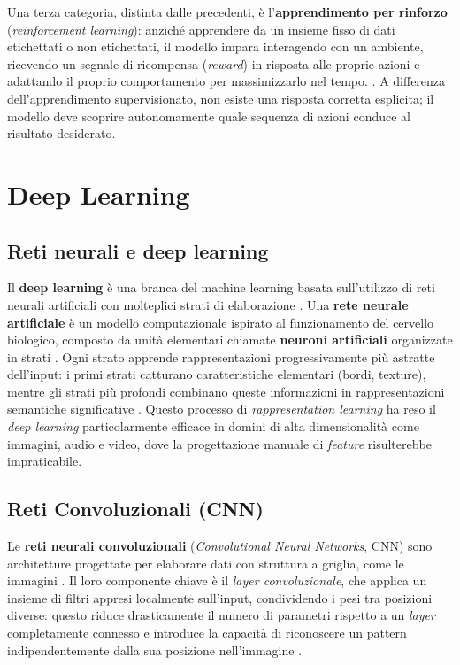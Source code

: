 Una terza categoria, distinta dalle precedenti, è l'\textbf{apprendimento per rinforzo} (\textit{reinforcement learning}): anziché apprendere da un insieme fisso di dati etichettati o non etichettati, il modello impara interagendo con un ambiente, ricevendo un segnale di ricompensa (\textit{reward}) in risposta alle proprie azioni e adattando il proprio comportamento per massimizzarlo nel tempo. \cite{bishop2006pattern, sutton2018}. A differenza dell'apprendimento supervisionato, non esiste una risposta corretta esplicita; il modello deve scoprire autonomamente quale sequenza di azioni conduce al risultato desiderato.

\section{Deep Learning}
\subsection{Reti neurali e deep learning}
Il \textbf{deep learning} è una branca del machine learning basata sull'utilizzo di reti neurali artificiali con molteplici strati di elaborazione \cite{goodfellow2016deep}. Una \textbf{rete neurale artificiale} è un modello  computazionale ispirato al funzionamento del cervello 
biologico, composto da unità elementari chiamate \textbf{neuroni artificiali} organizzate in strati 
\cite{goodfellow2016deep}. Ogni strato apprende rappresentazioni progressivamente più astratte dell'input: i primi strati catturano caratteristiche elementari (bordi, texture), mentre gli strati più profondi combinano queste informazioni in rappresentazioni semantiche significative \cite{goodfellow2016deep}. Questo processo di \textit{rappresentation learning} ha reso il \textit{deep learning} particolarmente efficace in domini di alta dimensionalità come immagini, audio e video, dove la progettazione manuale di \textit{feature} risulterebbe impraticabile.

\subsection{Reti Convoluzionali (CNN)}
Le \textbf{reti neurali convoluzionali} (\textit{Convolutional Neural Networks}, CNN) sono architetture progettate per elaborare dati con struttura a griglia, come le immagini \cite{goodfellow2016deep}. Il loro componente chiave è il \textit{layer convoluzionale}, che applica un insieme di filtri appresi localmente sull'input, condividendo i pesi tra posizioni diverse: questo riduce drasticamente il numero di parametri rispetto a un \textit{layer} completamente connesso e introduce la capacità di riconoscere un pattern indipendentemente dalla sua posizione nell'immagine \cite{goodfellow2016deep}.
